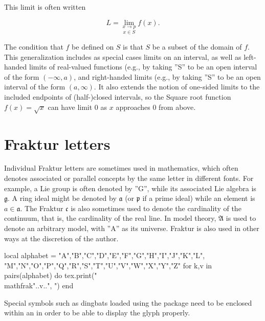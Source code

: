 {{{This limit is often written

\[
L = \underset{x\in S}{\lim_{x\to p}} f(x).
\]

The condition that $f$ be defined on $S$ is that $S$ be a subset of the domain of $f$.  This generalization includes as special cases limits on an interval, as well as left-handed limits of real-valued functions (e.g., by taking ''S'' to be an open interval of the form $(-\infty,a)$, and right-handed limits (e.g., by taking ''S'' to be an open interval of the form $(a,\infty)$. It also extends the notion of one-sided limits to the included endpoints of (half-)closed intervals, so the Square root function $f(x)=\sqrt{x}$ can have limit 0 as $x$ approaches 0 from above.




\section*{Fraktur letters}

Individual Fraktur letters are sometimes used in mathematics, which often denotes associated or parallel concepts by the same letter in different fonts. For example, a Lie group is often denoted by ''G'', while its associated Lie algebra is $\mathfrak{g}$. 
A ring ideal might be denoted by $\mathfrak{a}$ (or $\mathfrak{p}$ if a prime ideal) while an element is $a \in \mathfrak{a}$. The Fraktur $\mathfrak c$ is also sometimes used to denote the cardinality of the continuum, that is, the cardinality of the real line. In model theory, $\mathfrak{A}$ is used to denote an arbitrary model, with ''A'' as its universe. Fraktur is also used in other ways at the discretion of the author.


\begin{luacode}
local alphabet = {"A","B","C","D","E","F","G","H","I","J","K","L",
                  "M","N","O","P","Q","R","S","T","U","V","W","X","Y","Z"}
for k,v in pairs(alphabet) do
	tex.print("\\mathfrak{"..v.."}, ")
end
\end{luacode}

Special symbols such as dingbats loaded using the  package need to be enclosed within an  in order to be able to display the glyph properly.
\bigskip

}}}
